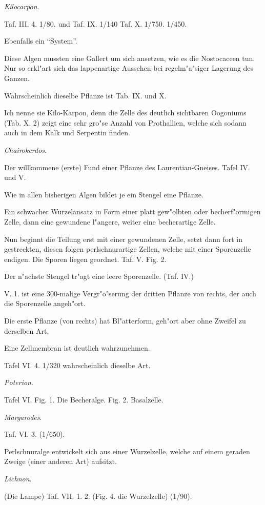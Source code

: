 \documentclass[a4paper, 11pt, oneside, german]{article}
\begin{document}
\emph{Kilocarpon}.

Taf. III. 4. 1/80. und Taf. IX. 1/140 Taf. X. 1/750. 1/450.

Ebenfalls ein "`System"'.

Diese Algen mussten eine Gallert um sich ansetzen, wie es die Nostocaceen tun. Nur so erkl"art sich das lappenartige Aussehen bei regelm"a"siger Lagerung des Ganzen.

Wahrscheinlich dieselbe Pflanze ist Tab. IX. und X.

Ich nenne sie Kilo-Karpon, denn die Zelle des deutlich sichtbaren Oogoniums (Tab. X. 2) zeigt eine sehr gro"se Anzahl von Prothallien, welche sich sodann auch in dem Kalk und Serpentin finden.

\emph{Chairokerdos}.

Der willkommene (erste) Fund einer Pflanze des Laurentian-Gneises. Tafel IV. und V.

Wie in allen bisherigen Algen bildet je ein Stengel eine Pflanze.

Ein schwacher Wurzelansatz in Form einer platt gew"olbten oder becherf"ormigen Zelle, dann eine gewundene l"angere, weiter eine becherartige Zelle.

Nun beginnt die Teilung erst mit einer gewundenen Zelle, setzt dann fort in gestreckten, diesen folgen perlschnurartige Zellen, welche mit einer Sporenzelle endigen. Die Sporen liegen geordnet. Taf. V. Fig. 2.

Der n"achste Stengel tr"agt eine leere Sporenzelle. (Taf. IV.)

V. 1. ist eine 300-malige Vergr"o"serung der dritten Pflanze von rechts, der auch die Sporenzelle angeh"ort.

Die erste Pflanze (von rechts) hat Bl"atterform, geh"ort aber ohne Zweifel zu derselben Art.

Eine Zellmembran ist deutlich wahrzunehmen.

Tafel VI. 4. 1/320 wahrscheinlich dieselbe Art.

\emph{Poterion}.

Tafel VI. Fig. 1. Die Becheralge. Fig. 2. Basalzelle.

\emph{Margarodes}.

Taf. VI. 3. (1/650).

Perlschnuralge entwickelt sich aus einer Wurzelzelle, welche auf einem geraden Zweige (einer anderen Art) aufsitzt.

\emph{Lichnon}.

(Die Lampe) Taf. VII. 1. 2. (Fig. 4. die Wurzelzelle) (1/90).
\end{document}
